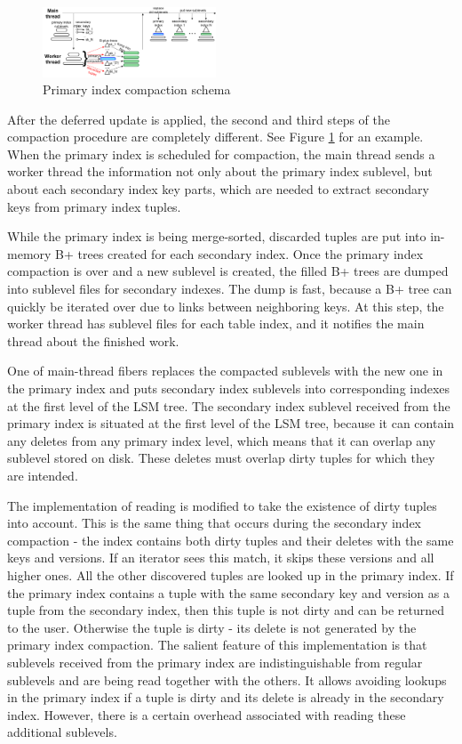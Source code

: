 \documentclass{vldb}
\begin{document}
\begin{figure}
\centering
\includegraphics[width=0.46\textwidth]{compaction_implementation}
\caption{Primary index compaction schema}
\label{fig:compaction_implementation}
\end{figure}
After the deferred update is applied, the second and third steps of the compaction
procedure are completely different. See Figure
\ref{fig:compaction_implementation} for an example. When the primary index is
scheduled for compaction, the main thread sends a worker thread the information
not only about the primary index sublevel, but about each secondary index key parts,
which are needed to extract secondary keys from primary index tuples.

While the primary index is being merge-sorted, discarded tuples are put into
in-memory B+ trees created for each secondary index. Once the
primary index compaction is over and a new sublevel is created, the filled
B+ trees are dumped into sublevel files for secondary indexes.
The dump is fast, because a B+ tree can quickly be iterated over due to
links between neighboring keys. At this step, the worker thread has sublevel files
for each table index, and it notifies the main thread about the finished work.

One of main-thread fibers replaces the compacted sublevels with the new one in the
primary index and puts secondary index sublevels into corresponding indexes
at the first level of the LSM tree. The secondary index sublevel received from the primary
index is situated at the first level of the LSM tree, because it can contain any deletes from
any primary index level, which means that it can overlap any sublevel stored on disk.
These deletes must overlap dirty tuples for which they are intended.

The implementation of reading is modified to take the existence of dirty tuples
into account. This is the same thing that occurs during the secondary index compaction -
the index contains both dirty tuples and their deletes with the same keys and
versions. If an iterator sees this match, it skips these versions and all higher ones.
All the other discovered tuples are looked up in the primary index. If the primary index
contains a tuple with the same secondary key and version as a tuple from
the secondary index, then this tuple is not dirty and can be returned to the
user. Otherwise the tuple is dirty - its delete is not generated by the primary
index compaction. The salient feature of this implementation is that sublevels
received from the primary index are indistinguishable from regular sublevels and
are being read together with the others. It allows avoiding lookups in the
primary index if a tuple is dirty and its delete is already in the secondary
index. However, there is a certain overhead associated with reading these
additional sublevels.
\end{document}
